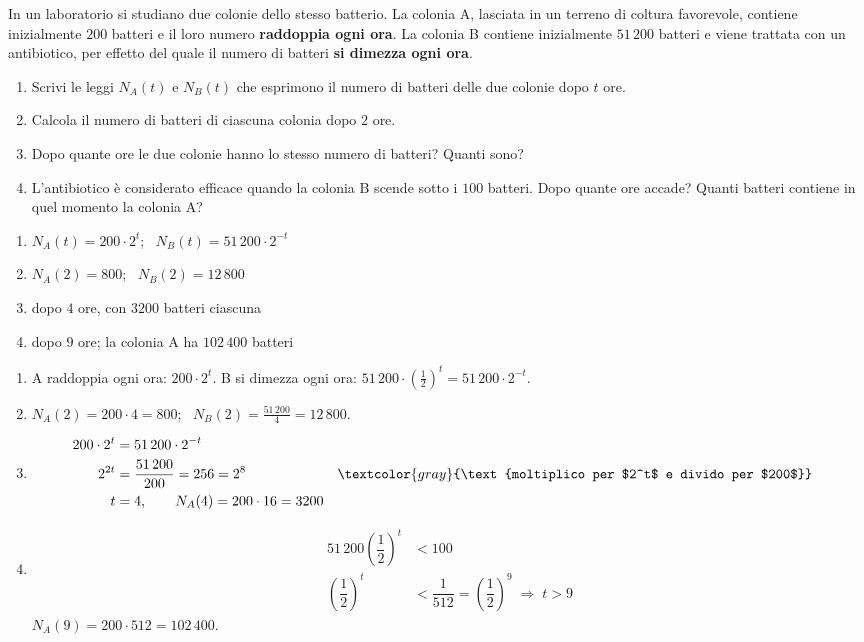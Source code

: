 \begin{question}[ID=6.5, subtitle={Due colonie batteriche a confronto}, difficulty=difficile, tags={problemi, esponenziali, crescita, decadimento, batteri}]
In un laboratorio si studiano due colonie dello stesso batterio. La colonia A, lasciata in un terreno di coltura favorevole, contiene inizialmente $200$ batteri e il loro numero \textbf{raddoppia ogni ora}. La colonia B contiene inizialmente $51\,200$ batteri e viene trattata con un antibiotico, per effetto del quale il numero di batteri \textbf{si dimezza ogni ora}.
\begin{enumerate}[label=\alph*),leftmargin=1.8cm]
    \item Scrivi le leggi $N_A(t)$ e $N_B(t)$ che esprimono il numero di batteri delle due colonie dopo $t$ ore.
    \item Calcola il numero di batteri di ciascuna colonia dopo $2$ ore.
    \item Dopo quante ore le due colonie hanno lo stesso numero di batteri? Quanti sono?
    \item L'antibiotico è considerato efficace quando la colonia B scende sotto i $100$ batteri. Dopo quante ore accade? Quanti batteri contiene in quel momento la colonia A?
\end{enumerate}
\begin{solution}
\begin{enumerate}[label=\alph*),leftmargin=1.8cm]
    \item $N_A(t)=200\cdot2^t$; \ $N_B(t)=51\,200\cdot2^{-t}$
    \item $N_A(2)=800$; \ $N_B(2)=12\,800$
    \item dopo $4$ ore, con $3200$ batteri ciascuna
    \item dopo $9$ ore; la colonia A ha $102\,400$ batteri
\end{enumerate}
\end{solution}
\begin{explanation}
\begin{enumerate}[label=\alph*),leftmargin=1.8cm]
    \item A raddoppia ogni ora: $200\cdot2^t$. B si dimezza ogni ora: $51\,200\cdot\left(\tfrac12\right)^t=51\,200\cdot2^{-t}$.
    \item $N_A(2)=200\cdot4=800$; \ $N_B(2)=\tfrac{51\,200}{4}=12\,800$.
    \item \[\begin{aligned}
    200\cdot2^t &= 51\,200\cdot2^{-t}\\
    2^{2t} &= \dfrac{51\,200}{200}=256=2^8 && \textcolor{gray}{\text{moltiplico per $2^t$ e divido per $200$}}\\
    t &= 4, \qquad N_A(4)=200\cdot16=3200
    \end{aligned}\]
    \item \[\begin{aligned}
    51\,200\left(\dfrac12\right)^t &< 100\\
    \left(\dfrac12\right)^t &< \dfrac1{512}=\left(\dfrac12\right)^9 \;\Rightarrow\; t>9
    \end{aligned}\]
    $N_A(9)=200\cdot512=102\,400$.
\end{enumerate}
\end{explanation}
\end{question}
